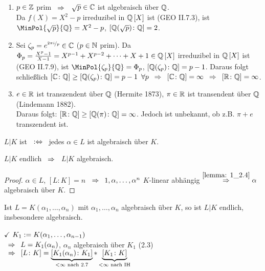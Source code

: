 \begin{beispiel}
    \begin{enumerate}[leftmargin=*, label=(\alph*)]
        \item $p \in \mathbb{Z}$ prim $\enskip \Rightarrow \enskip$ $\sqrt{p} \in \mathbb{C}$ ist algebraisch über $\mathbb{Q}$. \\
        Da $f(X) = X^2 - p$ irreduzibel in $\polynom[\Q]$ ist (GEO II.7.3), ist $\MinPol{\sqrt{p}}{\Q} = X^2 - p$, $[\mathbb{Q}(\sqrt{p}) \colon \mathbb{Q}] = 2$.
        \item Sei $\zeta_p = e^{\lfrac{2\pi i}{p}} \in \C$ ($p \in \mathbb{N}$ prim). Da $\Phi_p =  \frac{X^p-1}{X-1} = X^{p-1} + X^{p-2} + \cdots + X + 1 \in \polynom[\Q]$ irreduzibel in $\polynom[\Q]$ ist (GEO II.7.9), ist $\MinPol{\zeta_p}{\Q} = \Phi_p$, $[\mathbb{Q}(\zeta_p) \colon \mathbb{Q}] = p-1$. Daraus folgt schließlich $[\mathbb{C} \colon \mathbb{Q}] \geq [\mathbb{Q}(\zeta_p) \colon \mathbb{Q}] = p-1 \enskip \forall p \enskip \Rightarrow \enskip [\mathbb{C} \colon \mathbb{Q}] = \infty \enskip \Rightarrow \enskip [\mathbb{R} \colon \mathbb{Q}] = \infty$.
        \item $e \in \mathbb{R}$ ist transzendent über $\mathbb{Q}$ (Hermite 1873), 
        $\pi \in \mathbb{R}$ ist transendent über $\mathbb{Q}$ (Lindemann 1882). \\
        Daraus folgt: $[\mathbb{R} \colon \mathbb{Q}] \geq [\mathbb{Q}(\pi) \colon \mathbb{Q}] = \infty$. Jedoch ist unbekannt, ob z.B. $\pi + e$ transzendent ist.
    \end{enumerate}
\end{beispiel}

\begin{definition}
    $L | K$ ist  $\enskip \mathrel{:\Leftrightarrow} \enskip$ jedes $\alpha \in L$ ist algebraisch über $K$.
\end{definition}

\begin{satz}
    $L | K$ endlich $\enskip \Rightarrow \enskip$ $L | K$ algebraisch.
\end{satz}
\begin{proof}
    $\alpha \in L$, $[L \colon K] = n$ $\enskip \Rightarrow \enskip 1, \alpha, \dots , \alpha^n$ $K$-linear abhängig $\overset{\ref{lemma: 1_2.4}}{\enskip \Rightarrow \enskip} \alpha$ algebraisch über $K$.
\end{proof}

\begin{korollar}
    Ist $L = K(\alpha_1, \dots, \alpha_n)$ mit $\alpha_1, \dots, \alpha_n$ algebraisch über $K$, so ist $L | K$ endlich, insbesondere algebraisch.
\end{korollar}
\begin{proof_induction}[$n$]
    \ianfang[$n=0$] $\checkmark$
    \ischritt[$n > 0$] $K_1 \mathrel{:=} K(\alpha_1, \dots, \alpha_{n-1})$ \\
        $\enskip \Rightarrow \enskip L=K_1(\alpha_n)$, $\alpha_n$ algebraisch über $K_1$ (2.3) \\
        $\enskip \Rightarrow \enskip [L \colon K] = \underbrace{[K_1(\alpha_n) \colon K_1]}_{< \infty \text{ nach 2.7}}* \underbrace{[K_1 \colon K]}_{< \infty \text{ nach IH}}$
\end{proof_induction} 

